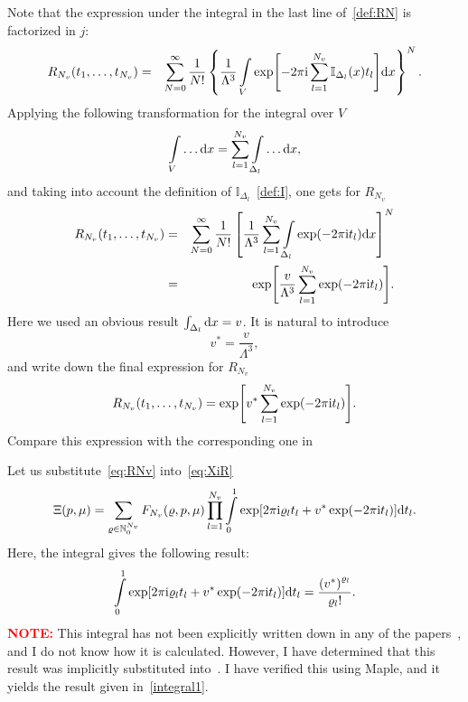 \documentclass[12pt]{article}
\numberwithin{equation}{section}
\begin{document}
	Note that the expression under the integral in the last line of~\eqref{def:RN} is factorized in $j$:
	\begin{eqnarray}
		R_{N_v}(t_1, \ldots, t_{N_v}) & = & \sum_{N=0}^{\infty}\frac{1}{N!} 
		\left\{\frac{1}{\Lambda^{3}} \int\limits_V \exp[-2\pi{\rm i}\sum_{l=1}^{N_v} \mathbb{I}_{\Delta_{l}}(x) t_l] {\rm d}x \right\}^N.
	\end{eqnarray}
	Applying the following transformation for the integral over $V$
	\begin{equation}
		\int\limits_V \ldots {\rm d}x = \sum_{l=1}^{N_v}\int\limits_{\Delta_l} \ldots {\rm d}x,
	\end{equation}
	and taking into account the definition of $\mathbb{I}_{\Delta_l}$~\eqref{def:I}, one gets for $R_{N_v}$
	\begin{eqnarray}
		\label{eq:RNL}
		R_{N_v}(t_1, \ldots, t_{N_v}) & = & \sum_{N=0}^{\infty}\frac{1}{N!} \left[ \frac{1}{\Lambda^3} \sum_{l=1}^{N_v} \int\limits_{\Delta_l} \exp(-2\pi{\rm i}t_l) {\rm d}x \right]^N
		\nonumber\\
		&=& \exp[\frac{v}{\Lambda^3} \sum_{l=1}^{N_v} \exp(-2\pi{\rm i} t_l)].
	\end{eqnarray}
	Here we used an obvious result $\int_{\Delta_l} {\rm d}x = v$. It is natural to introduce
	\begin{equation}
		v^* = \frac{v}{\Lambda^3},
	\end{equation}
	and write down the final expression for $R_{N_v}$
	\begin{equation}
		\label{eq:RNv}
		R_{N_v}(t_1, \ldots, t_{N_v}) = \exp[v^* \sum_{l=1}^{N_v} \exp(-2\pi{\rm i} t_l)].
	\end{equation}
	Compare this expression with the corresponding one in~\cite[p.~4]{KKD20} 
	
	Let us substitute~\eqref{eq:RNv} into~\eqref{eq:XiR}
	\begin{equation}
		\label{eq:XiIntt}
		\Xi(p,\mu) = \sum_{\varrho \in \mathbb{N}_0^{N_v}} F_{N_v}(\varrho, p, \mu) \prod\limits_{l=1}^{N_v} \int\limits_{0}^{1} \exp[2\pi{\rm i}\varrho_l t_l + v^* \exp(-2\pi{\rm i} t_l)] {\rm d} t_l.
	\end{equation}
	Here, the integral gives the following result:
	\begin{equation}
		\label{integral1}
		\int\limits_{0}^{1} \exp[2\pi{\rm i}\varrho_l t_l + v^* \exp(-2\pi{\rm i} t_l)] {\rm d} t_l = \frac{{(v^*)}^{\varrho_l}}{\varrho_l !}.
	\end{equation}
	\textbf{\textcolor{Red}{NOTE:}} This integral has not been explicitly written down in any of the papers~\cite{KKD18, KKD20, KD22}, and I do not know how it is calculated. However, I have determined that this result was implicitly substituted into~\cite[(2.11)]{KKD20}. I have verified this using Maple, and it yields the result given in~\eqref{integral1}.
	
\end{document}
